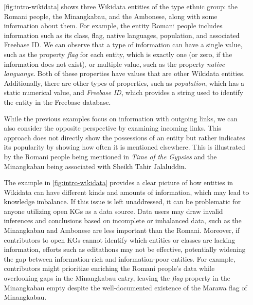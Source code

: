 \autoref{fig:intro-wikidata} shows three Wikidata entities of the type ethnic group: the Romani people, the Minangkabau, and the Ambonese, along with some information about them. For example, the entity Romani people includes information such as its class, flag, native languages, population, and associated Freebase ID. We can observe that a type of information can have a single value, such as the property \textit{flag} for each entity, which is exactly one (or zero, if the information does not exist), or multiple value, such as the property \textit{native languange}. Both of these properties have values that are other Wikidata entities. Additionally, there are other types of properties, such as \textit{population}, which has a static numerical value, and \textit{Freebase ID}, which provides a string used to identify the entity in the Freebase database.

While the previous examples focus on information with outgoing links, we can also consider the opposite perspective by examining incoming links. This approach does not directly show the possessions of an entity but rather indicates its popularity by showing how often it is mentioned elsewhere. This is illustrated by the Romani people being mentioned in \textit{Time of the Gypsies} and the Minangkabau being associated with Sheikh Tahir Jalaluddin.

The example in \autoref{fig:intro-wikidata} provides a clear picture of how entities in Wikidata can have different kinds and amounts of information, which may lead to knowledge imbalance. If this issue is left unaddressed, it can be problematic for anyone utilizing open KGs as a data source. Data users may draw invalid inferences and conclusions based on incomplete or imbalanced data, such as the Minangkabau and Ambonese are less important than the Romani. Moreover, if contributors to open KGs cannot identify which entities or classes are lacking information, efforts such as editathons may not be effective, potentially widening the gap between information-rich and information-poor entities. For example, contributors might prioritize enriching the Romani people's data while overlooking gaps in the Minangkabau entry, leaving the \textit{flag} property in the Minangkabau empty despite the well-documented existence of the Marawa flag of Minangkabau.


